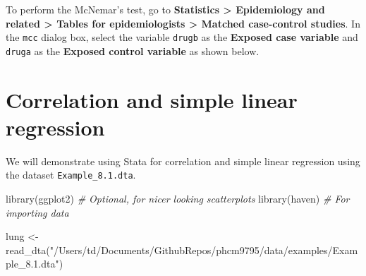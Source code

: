 \documentclass[
]{memoir}
\newenvironment{Shaded}{\begin{snugshade}}{\end{snugshade}}
\newcommand{\CommentTok}[1]{\textcolor[rgb]{0.56,0.35,0.01}{\textit{#1}}}
\newcommand{\FunctionTok}[1]{\textcolor[rgb]{0.00,0.00,0.00}{#1}}
\newcommand{\NormalTok}[1]{#1}
\newcommand{\OtherTok}[1]{\textcolor[rgb]{0.56,0.35,0.01}{#1}}
\newcommand{\SpecialCharTok}[1]{\textcolor[rgb]{0.00,0.00,0.00}{#1}}
\newcommand{\StringTok}[1]{\textcolor[rgb]{0.31,0.60,0.02}{#1}}
\begin{document}
To perform the McNemar's test, go to \textbf{Statistics \textgreater{} Epidemiology and related \textgreater{} Tables for epidemiologists \textgreater{} Matched case-control studies}. In the \texttt{mcc} dialog box, select the variable \texttt{drugb} as the \textbf{Exposed case variable} and \texttt{druga} as the \textbf{Exposed control variable} as shown below.

\begin{Shaded}
\end{Shaded}

\hypertarget{correlation-and-simple-linear-regression}{%
\chapter{Correlation and simple linear regression}\label{correlation-and-simple-linear-regression}}

We will demonstrate using Stata for correlation and simple linear regression using the dataset \texttt{Example\_8.1.dta}.

\begin{Shaded}
\begin{Highlighting}[]
\FunctionTok{library}\NormalTok{(ggplot2)   }\CommentTok{\# Optional, for nicer looking scatterplots}
\FunctionTok{library}\NormalTok{(haven)     }\CommentTok{\# For importing data}

\NormalTok{lung }\OtherTok{\textless{}{-}} \FunctionTok{read\_dta}\NormalTok{(}\StringTok{"/Users/td/Documents/GithubRepos/phcm9795/data/examples/Example\_8.1.dta"}\NormalTok{)}
\end{Highlighting}
\end{Shaded}
\end{document}
